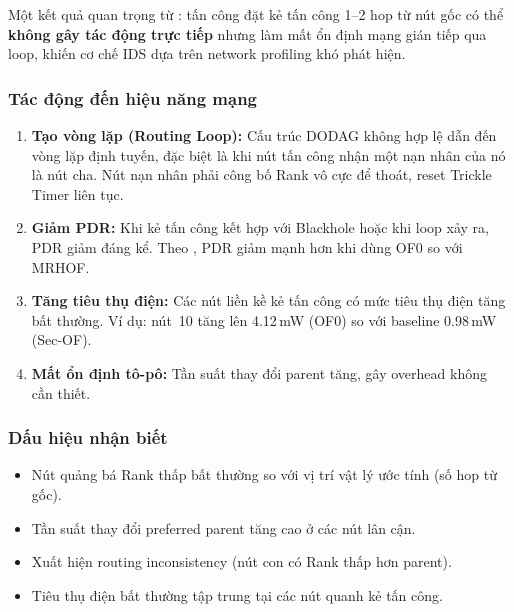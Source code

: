 Một kết quả quan trọng từ \cite{decrank2022}: tấn công đặt kẻ tấn công
1--2 hop từ nút gốc có thể \textbf{không gây tác động trực tiếp} nhưng
làm mất ổn định mạng gián tiếp qua loop, khiến cơ chế IDS dựa trên
network profiling khó phát hiện.

\subsubsection{Tác động đến hiệu năng mạng}

\begin{enumerate}
    \item \textbf{Tạo vòng lặp (Routing Loop):} Cấu trúc DODAG không
          hợp lệ dẫn đến vòng lặp định tuyến, đặc biệt là khi nút tấn công nhận một nạn nhân của nó là nút cha. Nút nạn nhân phải công bố Rank
          vô cực để thoát, reset Trickle Timer liên tục.

    \item \textbf{Giảm PDR:} Khi kẻ tấn công kết hợp với Blackhole hoặc
          khi loop xảy ra, PDR giảm đáng kể. Theo \cite{decrank2022},
          PDR giảm mạnh hơn khi dùng OF0 so với MRHOF.

    \item \textbf{Tăng tiêu thụ điện:} Các nút liền kề kẻ tấn công có
          mức tiêu thụ điện tăng bất thường. Ví dụ: nút~10 tăng lên
          4.12\,mW (OF0) so với baseline 0.98\,mW (Sec-OF).

    \item \textbf{Mất ổn định tô-pô:} Tần suất thay đổi parent tăng,
          gây overhead không cần thiết.
\end{enumerate}

\subsubsection{Dấu hiệu nhận biết}

\begin{itemize}
    \item Nút quảng bá Rank thấp bất thường so với vị trí vật lý ước
          tính (số hop từ gốc).
    \item Tần suất thay đổi preferred parent tăng cao ở các nút lân cận.
    \item Xuất hiện routing inconsistency (nút con có Rank thấp hơn
          parent).
    \item Tiêu thụ điện bất thường tập trung tại các nút quanh kẻ
          tấn công.
\end{itemize}

